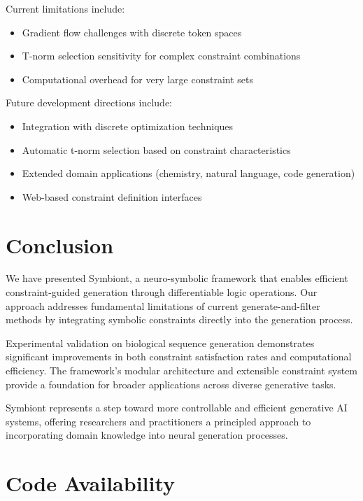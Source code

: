 \documentclass[conference]{IEEEtran}
\begin{document}
Current limitations include:

\begin{itemize}
    \item Gradient flow challenges with discrete token spaces
    \item T-norm selection sensitivity for complex constraint combinations
    \item Computational overhead for very large constraint sets
\end{itemize}

Future development directions include:

\begin{itemize}
    \item Integration with discrete optimization techniques
    \item Automatic t-norm selection based on constraint characteristics
    \item Extended domain applications (chemistry, natural language, code generation)
    \item Web-based constraint definition interfaces
\end{itemize}

\section{Conclusion}

We have presented Symbiont, a neuro-symbolic framework that enables efficient constraint-guided generation through differentiable logic operations. Our approach addresses fundamental limitations of current generate-and-filter methods by integrating symbolic constraints directly into the generation process.

Experimental validation on biological sequence generation demonstrates significant improvements in both constraint satisfaction rates and computational efficiency. The framework's modular architecture and extensible constraint system provide a foundation for broader applications across diverse generative tasks.

Symbiont represents a step toward more controllable and efficient generative AI systems, offering researchers and practitioners a principled approach to incorporating domain knowledge into neural generation processes.

\section*{Code Availability}
\end{document}

